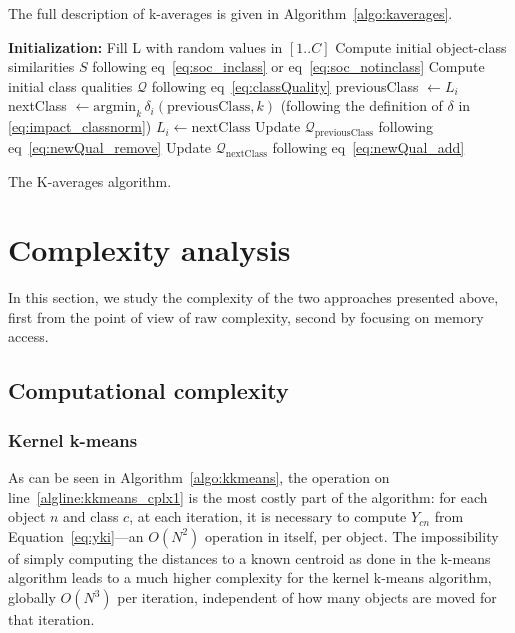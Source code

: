 \documentclass[natbib,smallextended]{svjour3}
\newcommand{\cad}{---} %
\begin{document}
The full description of k-averages is given in Algorithm~\ref{algo:kaverages}.

\begin{algorithm}
	\label{algo:kaverages}
	\SetAlgoLined
	\BlankLine
	\textbf{Initialization:}
		Fill L with random values in $[1..C]$\;
		Compute initial object-class similarities $S$ following eq~\ref{eq:soc_inclass} or eq~\ref{eq:soc_notinclass}\;
		Compute initial class qualities $\mathcal{Q}$ following eq~\ref{eq:classQuality}\;
	\BlankLine
	 {
		 {
			previousClass $\leftarrow L_i$\;
			nextClass $\leftarrow \mathrm{argmin}_k\,\delta_i(\mathrm{previousClass}, k)$ \label{algline:kaverages_search}
			(following the definition of $\delta$ in  \ref{eq:impact_classnorm})\; %
			 {
				$L_i \leftarrow \mathrm{nextClass}$\;
				Update $\mathcal{Q}_\mathrm{previousClass}$ following eq~\ref{eq:newQual_remove}\;
				Update $\mathcal{Q}_\mathrm{nextClass}$ following eq~\ref{eq:newQual_add}\;
			}
		}
	}
	\BlankLine
	\caption{The K-averages algorithm.}
\end{algorithm}


\section{Complexity analysis}
\label{sec:complexity}

In this section, we study the complexity of the two approaches presented above, first from the point of view of raw complexity, second by focusing on memory access.

\subsection{Computational complexity}

\subsubsection{Kernel k-means}

As can be seen in Algorithm~\ref{algo:kkmeans}, the operation on line~\ref{algline:kkmeans_cplx1} is the most costly part of the algorithm: for each object $n$ and class $c$, at each iteration, it is necessary to compute $Y_{cn}$ from Equation~\ref{eq:yki}\cad{}an $O(N^2)$ operation in itself, per object. The impossibility of simply computing the distances to a known centroid as done in the k-means algorithm leads to a much higher complexity for the kernel k-means algorithm, globally $O(N^3)$ per iteration, independent of how many objects are moved for that iteration.
\end{document}
